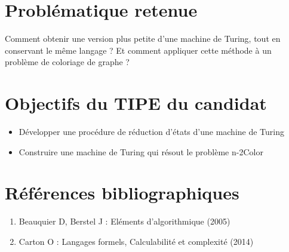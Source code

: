 \documentclass{article}
\begin{document}
\section{Problématique retenue}
Comment obtenir une version plus petite d'une machine de Turing, tout en
conservant le même langage ? Et comment appliquer cette méthode à un problème
de coloriage de graphe ?

\section{Objectifs du TIPE du candidat}
\begin{itemize}
    \item Développer une procédure de réduction d'états d'une machine de Turing
    \item Construire une machine de Turing qui résout le problème n-2Color
\end{itemize}

\section{Références bibliographiques}
\begin{enumerate}
    \item Beauquier D, Berstel J : Eléments d'algorithmique (2005)
    \item Carton O : Langages formels, Calculabilité et complexité (2014)
\end{enumerate}
\end{document}
